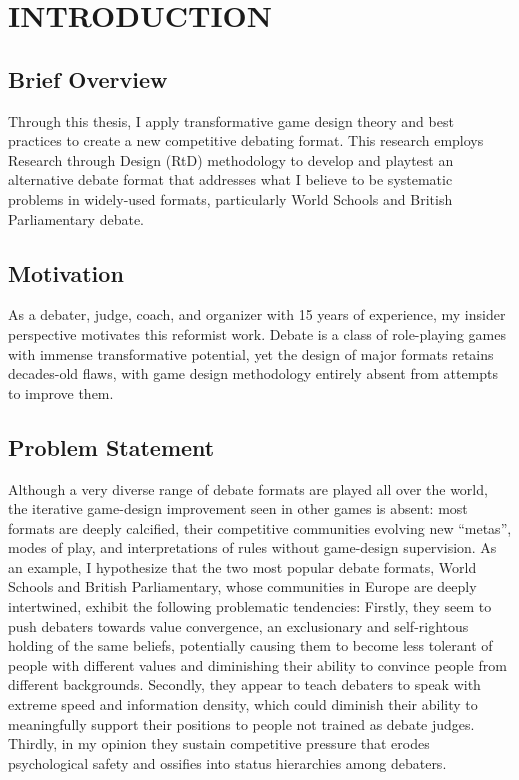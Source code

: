 \section{INTRODUCTION}

\subsection{Brief Overview}

Through this thesis, I apply transformative game design theory and best practices to create a new competitive debating format. This research employs Research through Design (RtD) methodology to develop and playtest an alternative debate format that addresses what I believe to be systematic problems in widely-used formats, particularly World Schools and British Parliamentary debate.

\subsection{Motivation}

As a debater, judge, coach, and organizer with 15 years of experience, my insider perspective motivates this reformist work. Debate is a class of role-playing games with immense transformative potential, yet the design of major formats retains decades-old flaws, with game design methodology entirely absent from attempts to improve them. 
\subsection{Problem Statement}

Although a very diverse range of debate formats are played all over the world, the iterative game-design improvement seen in other games is absent: most formats are deeply calcified, their competitive communities evolving new ``metas'', modes of play, and interpretations of rules without game-design supervision. As an example, I hypothesize that the two most popular debate formats, World Schools and British Parliamentary, whose communities in Europe are deeply intertwined, exhibit the following problematic tendencies:  Firstly, they seem to push debaters towards value convergence, an exclusionary and self-rightous holding of the same beliefs, potentially causing them to become less tolerant of people with different values and diminishing their ability to convince people from different backgrounds. Secondly, they appear to teach debaters to speak with extreme speed and information density, which could diminish their ability to meaningfully support their positions to people not trained as debate judges. Thirdly, in my opinion they sustain competitive pressure that erodes psychological safety and ossifies into status hierarchies among debaters.

